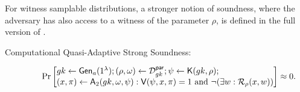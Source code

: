 For witness samplable distributions, a stronger notion of soundness, where the adversary has also access to a witness of the parameter $\rho$, is defined in the full version of \cite{AC:GonHevRaf15}.
\begin{description}
\item[Computational Quasi-Adaptive Strong Soundness:]
$$\Pr\begin{bmatrix*}[l]
    \gk \gets \G_a(1^\lambda);
    (\rho,\omega) \gets \dist_\gk^\mathsf{par};
    \psi \gets \algK(\gk, \rho); \\
    (x, \pi) \gets \advA_2(\gk, \omega,\psi) :
        \algV(\psi, x, \pi) = 1 \text{ and } \neg (\exists w : \R_\rho(x, w))
\end{bmatrix*} \approx 0.$$ 

\end{description}
